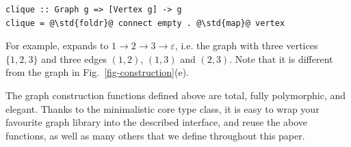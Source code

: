 \begin{verbatim}
clique :: Graph g => [Vertex g] -> g
clique = @\std{foldr}@ connect empty . @\std{map}@ vertex
\end{verbatim}

\noindent
For example,  expands to
$1 \rightarrow 2 \rightarrow 3 \rightarrow \varepsilon$, i.e.
the graph with three vertices $\{1, 2, 3\}$ and three edges $(1, 2)$, $(1, 3)$ and
$(2, 3)$. Note that it is different from the graph in Fig.~\ref{fig-construction}(e).

The graph construction functions defined above are total, fully polymorphic, and elegant.
Thanks to the minimalistic core type class, it is easy to wrap your favourite
graph library into the described interface, and reuse the above functions, as
well as many others that we define throughout this paper.
